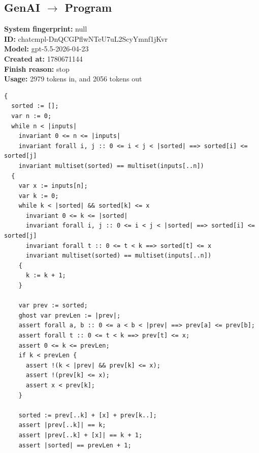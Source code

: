 \documentclass{article}
\begin{document}
\subsection*{GenAI $\rightarrow$ Program}
\textbf{System fingerprint: }null
\\\textbf{ID: }chatcmpl-DnQCGPflwNTeU7uL2ScyYmnf1jKvr
\\\textbf{Model: }gpt-5.5-2026-04-23
\\\textbf{Created at: }1780671144
\\\textbf{Finish reason: }stop
\\\textbf{Usage: }2979 tokens in, and 2056 tokens out
\begin{lstlisting}
{
  sorted := [];
  var n := 0;
  while n < |inputs|
    invariant 0 <= n <= |inputs|
    invariant forall i, j :: 0 <= i < j < |sorted| ==> sorted[i] <= sorted[j]
    invariant multiset(sorted) == multiset(inputs[..n])
  {
    var x := inputs[n];
    var k := 0;
    while k < |sorted| && sorted[k] <= x
      invariant 0 <= k <= |sorted|
      invariant forall i, j :: 0 <= i < j < |sorted| ==> sorted[i] <= sorted[j]
      invariant forall t :: 0 <= t < k ==> sorted[t] <= x
      invariant multiset(sorted) == multiset(inputs[..n])
    {
      k := k + 1;
    }

    var prev := sorted;
    ghost var prevLen := |prev|;
    assert forall a, b :: 0 <= a < b < |prev| ==> prev[a] <= prev[b];
    assert forall t :: 0 <= t < k ==> prev[t] <= x;
    assert 0 <= k <= prevLen;
    if k < prevLen {
      assert !(k < |prev| && prev[k] <= x);
      assert !(prev[k] <= x);
      assert x < prev[k];
    }

    sorted := prev[..k] + [x] + prev[k..];
    assert |prev[..k]| == k;
    assert |prev[..k] + [x]| == k + 1;
    assert |sorted| == prevLen + 1;


\end{lstlisting}
\end{document}
